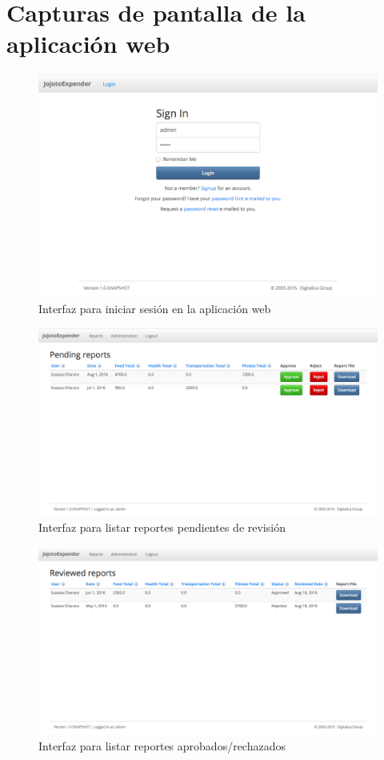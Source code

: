 \chapter{Capturas de pantalla de la aplicación web}

\begin{figure}[ht]
  \centering
  \includegraphics[scale=0.45,type=png,ext=.png,read=.png]{imagenes/login_web}
  \captionsetup{justification=centering}
  \caption{Interfaz para iniciar sesión en la aplicación web}
  \label{fig:interfazLoginWeb}
\end{figure}

\begin{figure}[ht]
  \centering
  \includegraphics[scale=0.35,type=png,ext=.png,read=.png]{imagenes/pending_reports}
  \captionsetup{justification=centering}
  \caption{Interfaz para listar reportes pendientes de revisión}
  \label{fig:interfazListarReportesPendientesApendice}
\end{figure}

\begin{figure}[h]
  \centering
  \includegraphics[scale=0.35,type=png,ext=.png,read=.png]{imagenes/reviewed_reports}
  \captionsetup{justification=centering}
  \caption{Interfaz para listar reportes aprobados/rechazados}
  \label{fig:interfazListarReportesRevisadosApendice}
\end{figure}